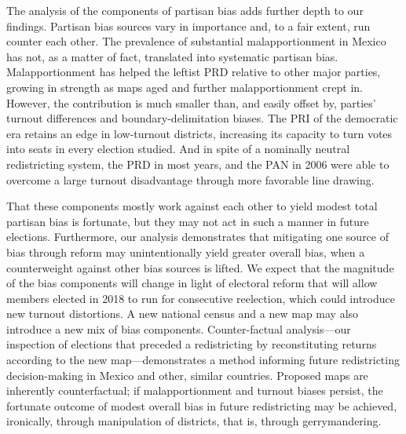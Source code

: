 \documentclass[letter,12pt]{article}
\begin{document}
{The analysis of the components of partisan bias adds further depth to our findings. Partisan bias sources vary in importance and, to a fair extent, run counter each other. The prevalence of substantial malapportionment in Mexico has not, as a matter of fact, translated into systematic partisan bias. Malapportionment has helped the leftist PRD relative to other major parties, growing in strength as maps aged and further malapportionment crept in. However, the contribution is much smaller than, and easily offset by, parties' turnout differences and boundary-delimitation biases. The PRI of the democratic era retains an edge in low-turnout districts, increasing its capacity to turn votes into seats in every election studied. And in spite of a nominally neutral redistricting system, the PRD in most years, and the PAN in 2006 were able to overcome a large turnout disadvantage through more favorable line drawing. 

That these components mostly work against each other to yield modest total partisan bias is fortunate, but they may not act in such a manner in future elections. Furthermore, our analysis demonstrates that mitigating one source of bias through reform may unintentionally yield greater overall bias, when a counterweight against other bias sources is lifted. We expect that the magnitude of the bias components will change in light of electoral reform that will allow members elected in 2018 to run for consecutive reelection, which could introduce new turnout distortions. A new national census and a new map may also introduce a new mix of bias components. Counter-factual analysis---our inspection of elections that preceded a redistricting by reconstituting returns according to the new map---demonstrates a method informing future redistricting decision-making in Mexico and other, similar countries. Proposed maps are inherently counterfactual; if malapportionment and turnout biases persist, the fortunate outcome of modest overall bias in future redistricting may be achieved, ironically, through manipulation of districts, that is, through gerrymandering.



}
\end{document}
